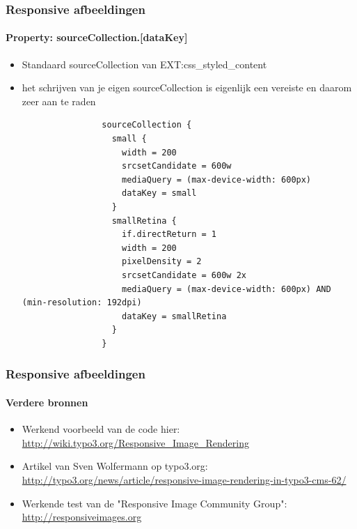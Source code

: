 
\begin{frame}[fragile]
	\frametitle{Responsive afbeeldingen}
	\framesubtitle{Property: sourceCollection.[dataKey]}

	\begin{itemize}
		\item Standaard sourceCollection van EXT:css\_styled\_content
		\item het schrijven van je eigen sourceCollection is eigenlijk een vereiste en daarom zeer aan te raden
		\lstset{
				basicstyle=\tiny\ttfamily
			}

			\begin{lstlisting}
				sourceCollection {
				  small {
				    width = 200
				    srcsetCandidate = 600w
				    mediaQuery = (max-device-width: 600px)
				    dataKey = small
				  }
				  smallRetina {
				    if.directReturn = 1
				    width = 200
				    pixelDensity = 2
				    srcsetCandidate = 600w 2x
				    mediaQuery = (max-device-width: 600px) AND (min-resolution: 192dpi)
				    dataKey = smallRetina
				  }
				}
			\end{lstlisting}
	\end{itemize}

\end{frame}


\begin{frame}[fragile]
	\frametitle{Responsive afbeeldingen}
	\framesubtitle{Verdere bronnen}

	\begin{itemize}
		\item Werkend voorbeeld van de code hier:\newline
			\small\url{http://wiki.typo3.org/Responsive_Image_Rendering}\normalsize

		\item Artikel van Sven Wolfermann op typo3.org:\newline
			\small\url{http://typo3.org/news/article/responsive-image-rendering-in-typo3-cms-62/}\normalsize

		\item Werkende test van de "Responsive Image Community Group":\newline
			\small\url{http://responsiveimages.org}\normalsize

	\end{itemize}

\end{frame}


